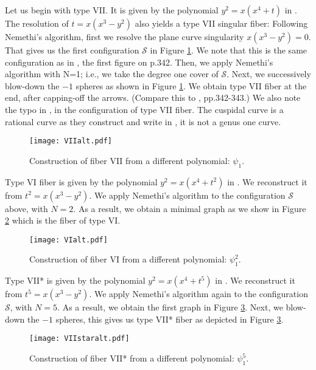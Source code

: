 \documentclass[11pt,letterpaper,reqno]{amsart}
\theoremstyle{remark}
\begin{document}
Let us begin with type VII. It is given by the polynomial $y^2=x(x^4+t)$ in \cite{NamikawaUeno-list}. The resolution of $t=x(x^3-y^2)$ also yields a type VII singular fiber: Following Nemethi's algorithm, first we resolve the plane curve singularity $x(x^3-y^2)=0$. That gives us the first configuration $\mathcal{S}$ in Figure \ref{VIIalt}. We note that this is the same configuration as in \cite{NamikawaUeno-long}, the first figure on p.342. Then, we apply Nemethi's algorithm with N=1; i.e., we take the degree one cover of $\mathcal{S}$. Next, we successively blow-down the $-1$ spheres as shown in Figure \ref{VIIalt}. We obtain type VII fiber at the end, after capping-off the arrows. (Compare this to \cite{NamikawaUeno-long}, pp.342-343.) We also note the typo in \cite{NamikawaUeno-list}, in the configuration of type VII fiber. The cuspidal curve is a rational curve as they construct and write in \cite{NamikawaUeno-long}, it is not a genus one curve.

\begin{figure}[htb]
{\texttt{[image: VIIalt.pdf]}}
\caption{Construction of fiber VII from a different polynomial: $\psi_1$.}
\label{VIIalt}
\end{figure}



Type VI fiber is given by the polynomial $y^2=x(x^4+t^2)$ in \cite{NamikawaUeno-list}. We reconstruct it from $t^2=x(x^3-y^2)$. We apply Nemethi's algorithm to the configuration $\mathcal{S}$ above, with $N=2$. As a result, we obtain a minimal graph as we show in Figure \ref{VIalt} which is the fiber of type VI.

\begin{figure}[htb]
{\texttt{[image: VIalt.pdf]}}
\caption{Construction of fiber VI from a different polynomial: $\psi_1^2$.}
\label{VIalt}
\end{figure}


Type VII* is given by the polynomial $y^2=x(x^4+t^5)$ in \cite{NamikawaUeno-list}. We reconstruct it from $t^5=x(x^3-y^2)$. We apply Nemethi's algorithm again to the configuration $\mathcal{S}$, with $N=5$. As a result, we obtain the first graph in Figure \ref{VII*alt}. Next, we blow-down the $-1$ spheres, this gives us type VII* fiber as depicted in Figure \ref{VII*alt}.


\begin{figure}[htb]
{\texttt{[image: VIIstaralt.pdf]}}
\caption{Construction of fiber VII* from a different polynomial: $\psi_1^5$.}
\label{VII*alt}
\end{figure}
\end{document}
